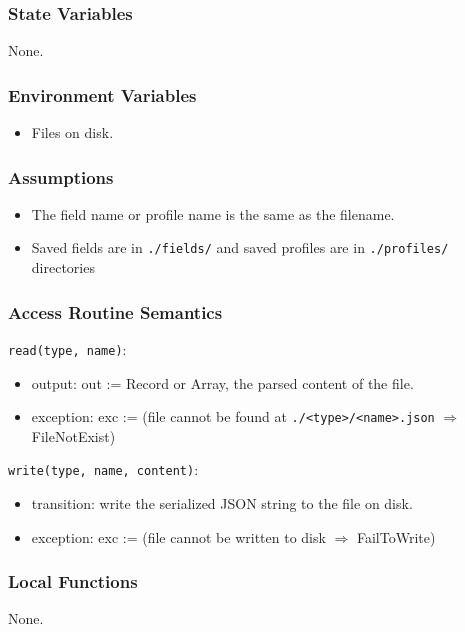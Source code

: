 \documentclass[12pt, titlepage]{article}
\begin{document}
\subsubsection{State Variables}
None.

\subsubsection{Environment Variables}
\begin{itemize}
  \item Files on disk.
\end{itemize}

\subsubsection{Assumptions}
\begin{itemize}
  \item The field name or profile name is the same as the filename.
  \item Saved fields are in \texttt{./fields/} and saved profiles are in \texttt{./profiles/} directories
\end{itemize}


\subsubsection{Access Routine Semantics}

\noindent \texttt{read(type, name)}:
\begin{itemize}
\item output: out := Record or Array, the parsed content of the file.
\item exception: exc := (file cannot be found at \texttt{./<type>/<name>.json} $\Rightarrow$ FileNotExist)
\end{itemize}

\noindent \texttt{write(type, name, content)}:
\begin{itemize}
\item transition: write the serialized JSON string to the file on disk.
\item exception: exc := (file cannot be written to disk $\Rightarrow$ FailToWrite)
\end{itemize}

\subsubsection{Local Functions}

None.
\end{document}
